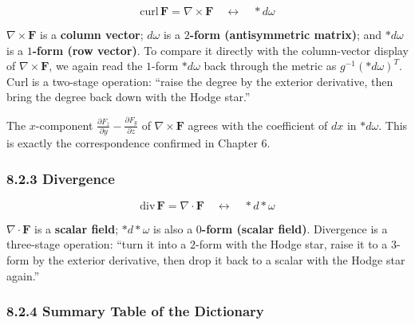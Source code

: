 \documentclass[a4paper,12pt,openany]{book}
\begin{document}
\[
\mathrm{curl}\,\mathbf{F} = \nabla \times \mathbf{F}
\quad\longleftrightarrow\quad
\ast d\omega
\]

\(\nabla\times\mathbf{F}\) is a \textbf{column vector}; \(d\omega\) is a
\textbf{$2$-form (antisymmetric matrix)}; and \(\ast d\omega\) is a
\textbf{$1$-form (row vector)}. To compare it directly with the
column-vector display of \(\nabla\times\mathbf F\), we again read the
\(1\)-form \(\ast d\omega\) back through the metric as
\(g^{-1}(\ast d\omega)^T\). Curl is a two-stage operation: ``raise the
degree by the exterior derivative, then bring the degree back down with
the Hodge star.''

The \(x\)-component
\(\frac{\partial F_z}{\partial y} - \frac{\partial F_y}{\partial z}\) of
\(\nabla\times\mathbf{F}\) agrees with the coefficient of \(dx\) in
\(\ast d\omega\). This is exactly the correspondence confirmed in
Chapter 6.

\hypertarget{divergence-1}{%
\subsubsection{8.2.3 Divergence}\label{divergence-1}}

\[
\mathrm{div}\,\mathbf{F} = \nabla \cdot \mathbf{F}
\quad\longleftrightarrow\quad
\ast d \ast \omega
\]

\(\nabla\cdot\mathbf{F}\) is a \textbf{scalar field};
\(\ast d\ast\omega\) is also a \textbf{$0$-form (scalar field)}.
Divergence is a three-stage operation: ``turn it into a \(2\)-form with
the Hodge star, raise it to a \(3\)-form by the exterior derivative,
then drop it back to a scalar with the Hodge star again.''

\hypertarget{summary-table-of-the-dictionary}{%
\subsubsection{8.2.4 Summary Table of the
Dictionary}\label{summary-table-of-the-dictionary}}
\end{document}
